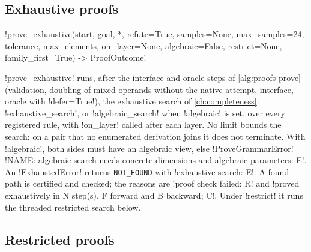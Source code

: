 \subsection{Exhaustive proofs}

\begin{signature}
\py!prove_exhaustive(start, goal, *, refute=True, samples=None, max_samples=24, tolerance, max_elements, on_layer=None, algebraic=False, restrict=None, family_first=True) -> ProofOutcome!
\end{signature}

\py!prove_exhaustive! runs, after the interface and oracle steps of \cref{alg:proofs-prove} (validation, doubling of mixed operands without the native attempt, interface, oracle with \py!defer=True!), the exhaustive search of \cref{ch:completeness}: \py!exhaustive_search!, or \py!algebraic_search! when \py!algebraic! is set, over every registered rule, with \py!on_layer! called after each layer. No limit bounds the search: on a pair that no enumerated derivation joins it does not terminate. With \py!algebraic!, both sides must have an algebraic view, else \py!ProveGrammarError! \code!NAME: algebraic search needs concrete dimensions and algebraic parameters: E!. An \py!ExhaustedError! returns \texttt{NOT\_FOUND} with \code!exhaustive search: E!. A found path is certified and checked; the reasons are \code!proof check failed: R! and \code!proved exhaustively in N step(s), F forward and B backward; C!. Under \py!restrict! it runs the threaded restricted search below.

\subsection{Restricted proofs}

